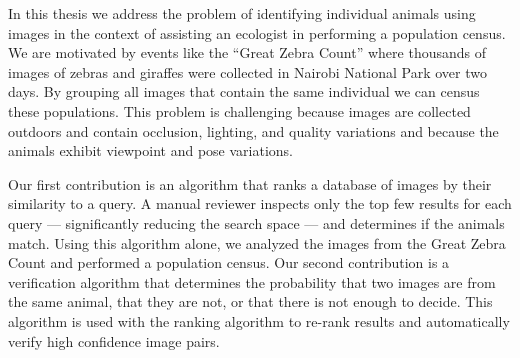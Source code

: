 \documentclass[chap]{thesis}
\author{Jonathan P. Crall
}
\begin{document}
\newcommand{\fnote}[1]{ (#1)}
\ifpublishversion{}
    \newcommand{\devcomment}[1]{}
    \newcommand{\chuckcomment}[1]{}
    \newcommand{\caplbl}[1]{}
\else
    \newcommand{\caplbl}[1]{\red(#1)\black\xspace}
    \newcommand{\devcomment}[1]{\marginpar{\scriptsize{\darkgreen{}\textbf{#1}\black{}}}}
    \newcommand{\chuckcomment}[1]{\marginpar{\scriptsize{\chuckblue{}\textbf{#1}\black{}}}}
\fi




\titlepagefinaldraft{}

\tableofcontents{}        

\listoftables{}          %
\listoffigures{}         %

\begin{comment}

Dana


Zach Jablons
Jason, Hendrick

Bill and Naomi Hoffman

Too many people at kitware to thank

Wes Turner, Rusty Blue,
Amitha Perea, Bob Obara
Roddy Collins, Arslan Basharat, Matt Turek

Chuck, Barb, Rich, and Bulent
\end{comment}


In this thesis we address the problem of identifying individual animals using images in the context of assisting
  an ecologist in performing a population census.
We are motivated by events like the ``Great Zebra Count'' where thousands of images of zebras and giraffes were
  collected in Nairobi National Park over two days.
By grouping all images that contain the same individual we can census these populations.
This problem is challenging because images are collected outdoors and contain occlusion, lighting, and quality
  variations and because the animals exhibit viewpoint and pose variations.

Our first contribution is an algorithm that ranks a database of images by their similarity to a query.
A manual reviewer inspects only the top few results for each query --- significantly reducing the search space
  --- and determines if the animals match.
Using this algorithm alone, we analyzed the images from the Great Zebra Count and performed a population census.
Our second contribution is a verification algorithm that determines the probability that two images are from the
  same animal, that they are not, or that there is not enough to decide.
This algorithm is used with the ranking algorithm to re-rank results and automatically verify high confidence
  image pairs.
\end{document}
